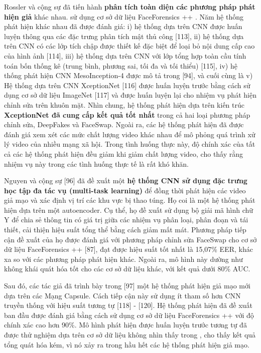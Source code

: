 \documentclass{article}
\begin{document}
Rossler và cộng sự đã tiến hành \textbf{phân tích toàn diện các phương pháp phát hiện giả} khác nhau. sử dụng cơ sở dữ liệu FaceForensics ++ . Năm hệ thống phát hiện khác nhau đã được đánh giá: i) hệ thống dựa trên CNN được huấn luyện thông qua các đặc trưng phân tích mật thủ công [113], ii) hệ thống dựa trên CNN có các lớp tích chập được thiết kế đặc biệt để loại bỏ nội dung cấp cao của hình ảnh [114], iii) hệ thống dựa trên CNN với lớp tổng hợp toàn cầu tính toán bốn thống kê (trung bình, phương sai, tối đa và tối thiểu) [115], iv) hệ thống phát hiện CNN MesoInception-4 được mô tả trong [94], và cuối cùng là v) Hệ thống dựa trên CNN XceptionNet [116] được huấn luyện trước bằng cách sử dụng cơ sở dữ liệu ImageNet [117] và được huấn luyện lại cho nhiệm vụ phát hiện chỉnh sửa trên khuôn mặt. Nhìn chung, hệ thống phát hiện dựa trên kiến trúc\textbf{ XceptionNet đã cung cấp kết quả tốt nhất} trong cả hai loại phương pháp chỉnh sửa, DeepFakes và FaceSwap. Ngoài ra, các hệ thống phát hiện đã được đánh giá xem xét các mức chất lượng video khác nhau để mô phỏng quá trình xử lý video của nhiều mạng xã hội. Trong tình huống thực này, độ chính xác của tất cả các hệ thống phát hiện đều giảm khi giảm chất lượng video, cho thấy rằng nhiệm vụ này trong các tình huống thực tế là rất khó khăn.

Nguyen và cộng sự [96] đã đề xuất một \textbf{hệ thống CNN sử dụng đặc trưng học tập đa tác vụ (multi-task learning)} để đồng thời phát hiện các video giả mạo và xác định vị trí các khu vực bị thao túng. Họ coi là một hệ thống phát hiện dựa trên một autoencoder. Cụ thể, họ đề xuất sử dụng bộ giải mã hình chữ Y để chia sẻ thông tin có giá trị giữa các nhiệm vụ phân loại, phân đoạn và tái thiết, cải thiện hiệu suất tổng thể bằng cách giảm mất mát. Phương pháp tiếp cận đề xuất của họ được đánh giá với phương pháp chỉnh sửa FaceSwap cho cơ sở dữ liệu FaceForensics ++ [87], đạt được hiệu suất tốt nhất là 15,07\% EER, khác xa so với các phương pháp phát hiện khác. Ngoài ra, mô hình này dường như không khái quát hóa tốt cho các cơ sở dữ liệu khác, với kết quả dưới 80\% AUC.

Sau đó, các tác giả đã trình bày trong [97] một hệ thống phát hiện giả mạo mới dựa trên các Mạng Capsule. Cách tiếp cận này sử dụng ít tham số hơn CNN truyền thống với hiệu suất tương tự [118] - [120]. Hệ thống phát hiện đã đề xuất ban đầu được đánh giá bằng cách sử dụng cơ sở dữ liệu FaceForensics ++ với độ chính xác cao hơn 90\%. Mô hình phát hiện được huấn luyện trước tương tự đã được thử nghiệm dựa trên cơ sở dữ liệu không nhìn thấy trong , cho thấy kết quả tổng quát hóa kém, vì nó xảy ra trong hầu hết các hệ thống phát hiện giả mạo.
\end{document}
